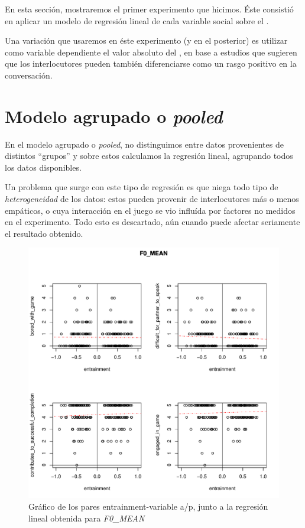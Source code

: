 En esta sección, mostraremos el primer experimento que hicimos. Éste consistió en aplicar un modelo de regresión lineal de cada variable social sobre el \entrainment.

Una variación que usaremos en éste experimento (y en el posterior) es utilizar como variable dependiente el valor absoluto del \entrainment, en base a estudios que sugieren que los interlocutores pueden también diferenciarse como un rasgo positivo en la conversación.

\section{Modelo agrupado o \emph{pooled}}

En el modelo agrupado o \emph{pooled}, no distinguimos entre datos provenientes de distintos ``grupos'' \cite{gujarati1999} y sobre estos calculamos la regresión lineal, agrupando todos los datos disponibles.

Un problema que surge con este tipo de regresión es que niega todo tipo de \emph{heterogeneidad} de los datos: estos pueden provenir de interlocutores más o menos empáticos, o cuya interacción en el juego se vio influída por factores no medidos en el experimento. Todo esto es descartado, aún cuando puede afectar seriamente  el resultado obtenido.


\begin{figure}[b!]
\includegraphics[width=15cm]{images/regression_F0_MEAN_1.pdf}
\caption{Gráfico de los pares entrainment-variable a/p, junto a la regresión lineal obtenida \label{regresion_clasica} para \emph{F0\_MEAN}}
\end{figure}

